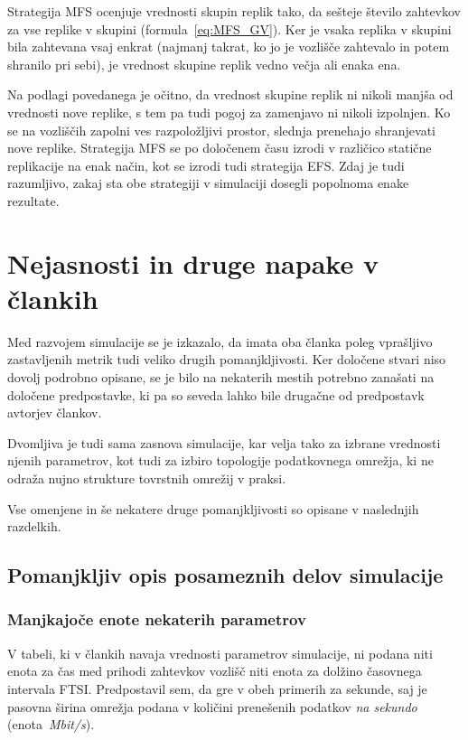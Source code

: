 \documentclass[a4paper, 12pt]{book}
\begin{document}
Strategija MFS ocenjuje vrednosti skupin replik tako, da sešteje število
zahtevkov za vse replike v skupini (formula~\eqref{eq:MFS_GV}). Ker je
vsaka replika v skupini bila zahtevana vsaj enkrat (najmanj takrat, ko jo
je vozlišče zahtevalo in potem shranilo pri sebi), je vrednost skupine replik
vedno večja ali enaka ena.

Na podlagi povedanega je očitno, da vrednost skupine replik ni nikoli manjša
od vrednosti nove replike, s tem pa tudi pogoj za zamenjavo ni nikoli
izpolnjen. Ko se na vozliščih zapolni ves razpoložljivi prostor, slednja
prenehajo shranjevati nove replike. Strategija MFS se po določenem času
izrodi v različico statične replikacije na enak način, kot se izrodi
tudi strategija EFS. Zdaj je tudi razumljivo, zakaj sta obe strategiji v
simulaciji dosegli popolnoma enake rezultate.


\section{Nejasnosti in druge napake v člankih}

Med razvojem simulacije se je izkazalo, da imata oba članka poleg vprašljivo
zastavljenih metrik tudi veliko drugih pomanjkljivosti. Ker določene stvari
niso dovolj podrobno opisane, se je bilo na nekaterih mestih
potrebno zanašati na določene predpostavke, ki pa so seveda lahko bile
drugačne od predpostavk avtorjev člankov.

Dvomljiva je tudi sama zasnova simulacije, kar velja tako za izbrane
vrednosti njenih parametrov, kot tudi za izbiro topologije podatkovnega
omrežja, ki ne odraža nujno strukture tovrstnih omrežij v praksi.

Vse omenjene in še nekatere druge pomanjkljivosti so opisane v naslednjih
razdelkih.

\subsection{Pomanjkljiv opis posameznih delov simulacije}

\subsubsection{Manjkajoče enote nekaterih parametrov}

V tabeli, ki v člankih navaja vrednosti parametrov simulacije, ni podana
niti enota za čas med prihodi zahtevkov vozlišč niti enota za dolžino
časovnega intervala FTSI. Predpostavil sem, da gre v obeh primerih za sekunde,
saj je pasovna širina omrežja podana v količini prenešenih podatkov
\textit{na sekundo} (enota~\textit{Mbit/s}).
\end{document}
